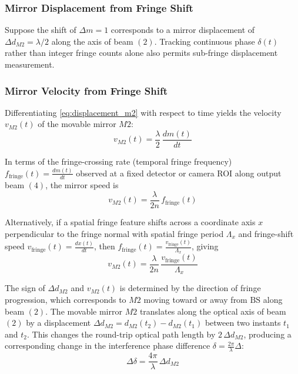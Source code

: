 \subsubsection{Mirror Displacement from Fringe Shift}
Suppose the shift of $\Delta m = 1$ corresponds to a mirror displacement of $\Delta d_{M2} = \lambda/2$ along the axis of beam $(2)$. Tracking continuous phase $\delta(t)$ rather than integer fringe counts alone also permits sub-fringe displacement measurement.

\subsubsection{Mirror Velocity from Fringe Shift}
Differentiating \cref{eq:displacement_m2} with respect to time yields the velocity $v_{M2}(t)$ of the movable mirror $M2$:
\begin{equation}
    v_{M2}(t) = \frac{\lambda}{2}\,\frac{dm(t)}{dt}
    \label{eq:velocity_m2}
\end{equation}

In terms of the fringe-crossing rate (temporal fringe frequency) $f_{\text{fringe}}(t) = \frac{dm(t)}{dt}$ observed at a fixed detector or camera ROI along output beam $(4)$, the mirror speed is
\begin{equation}
    v_{M2}(t) = \frac{\lambda}{2n}\,f_{\text{fringe}}(t)
    \label{eq:velocity_fringe_rate}
\end{equation}


Alternatively, if a spatial fringe feature shifts across a coordinate axis $x$ perpendicular to the fringe normal with spatial fringe period $\Lambda_x$ and fringe-shift speed $v_{\text{fringe}}(t) = \frac{dx(t)}{dt}$, then $f_{\text{fringe}}(t) = \frac{v_{\text{fringe}}(t)}{\Lambda_x}$, giving
\begin{equation}
    v_{M2}(t) = \frac{\lambda}{2n}\,\frac{v_{\text{fringe}}(t)}{\Lambda_x}
    \label{eq:velocity_spatial_shift}
\end{equation}


The sign of $\Delta d_{M2}$ and $v_{M2}(t)$ is determined by the direction of fringe progression, which corresponds to $M2$ moving toward or away from $\text{BS}$ along beam $(2)$. The movable mirror $M2$ translates along the optical axis of beam $(2)$ by a displacement $\Delta d_{M2} = d_{M2}(t_2) - d_{M2}(t_1)$ between two instants $t_1$ and $t_2$. This changes the round-trip optical path length by $2\,\Delta d_{M2}$, producing a corresponding change in the interference phase difference $\delta = \frac{2\pi}{\lambda}\Delta$:
\begin{equation}
    \Delta\delta = \frac{4\pi}{\lambda}\,\Delta d_{M2}
    \label{eq:phase_shift_m2}
\end{equation}


